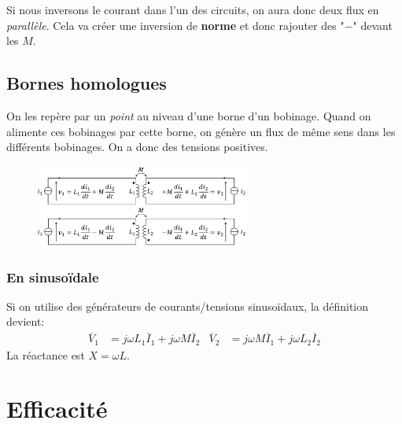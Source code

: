 \documentclass{report}
\begin{document}
Si nous inversons le courant dans l'un des circuits, on aura donc deux flux en \textit{parallèle}. Cela va créer une inversion de \textbf{norme} et donc rajouter des "$-$" devant les $M$.

\subsection{Bornes homologues}
On les repère par un \textit{point} au niveau d'une borne d'un bobinage. Quand on alimente ces bobinages par cette borne, on génère un flux de même sens dans les différents bobinages. On a donc des tensions positives.
\begin{figure}[H]
\centering
\includegraphics[width=7cm]{img/bornesHomologues.png}
\end{figure}
\subsubsection{En sinusoïdale}
Si on utilise des générateurs de courants/tensions sinusoïdaux, la définition devient:
\begin{align*}
\overline{V}_1 &= j \omega L_1 \overline{I}_1 + j \omega M \overline{I}_2 & \overline{V}_2 &= j \omega M \overline{I}_1 + j \omega L_2 \overline{I}_2
\end{align*}
La réactance est $X = \omega L$.

\section{Efficacité}
\end{document}
